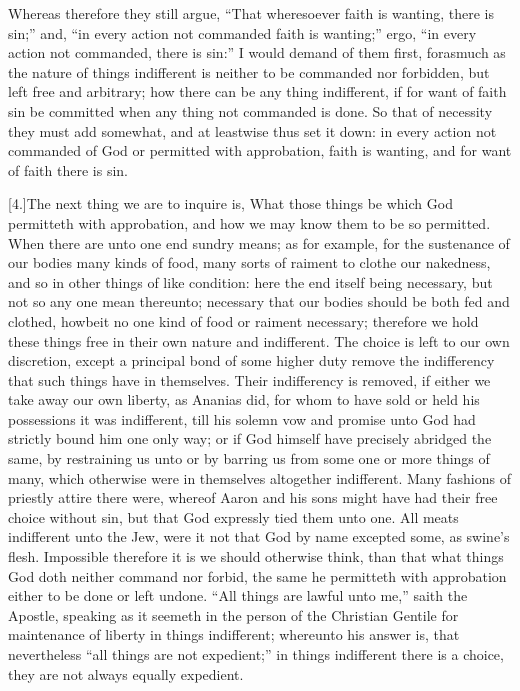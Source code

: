 Whereas therefore they still argue, “That wheresoever faith is wanting, there is sin;” and, “in every action not  commanded faith is wanting;” ergo, “in every action not commanded, there is sin:” I would demand of them first, forasmuch as the nature of things indifferent is neither to be commanded nor forbidden, but left free and arbitrary; how there can be any thing indifferent, if for want of faith sin be committed when any thing not commanded is done. So that of necessity they must add somewhat, and at leastwise thus set it down: in every action not commanded of God or permitted with approbation, faith is wanting, and for want of faith there is sin.

[4.]The next thing we are to inquire is, What those things be which God permitteth with approbation, and how we may know them to be so permitted. When there are unto one end sundry means; as for example, for the sustenance of our bodies many kinds of food, many sorts of raiment to clothe our nakedness, and so in other things of like condition: here the end itself being necessary, but not so any one mean thereunto; necessary that our bodies should be both fed and clothed, howbeit no one kind of food or raiment necessary; therefore we hold these things free in their own nature and indifferent. The choice is left to our own discretion, except a principal bond of some higher duty remove the indifferency that such things have in themselves. Their indifferency is removed, if either we take away our own liberty, as Ananias did, for whom to have sold or held his possessions it was indifferent, till his solemn vow and promise unto God had strictly bound him one only way; or if God himself have precisely abridged the same, by restraining us unto or by barring us from some one or more things of many, which otherwise were in themselves altogether indifferent. Many fashions of priestly attire there were, whereof Aaron and his sons might have had their free choice without sin, but that God expressly tied them unto one. All meats indifferent unto the Jew, were it not that God by name excepted some, as swine’s flesh. Impossible therefore it is we should otherwise think, than that what things God doth neither command nor forbid, the same he permitteth with approbation either to be done or left undone.  “All things are lawful unto me,” saith the Apostle, speaking as it seemeth in the person of the Christian Gentile for maintenance of liberty in things indifferent; whereunto his answer is, that nevertheless “all things are not expedient;” in things indifferent there is a choice, they are not always equally expedient.

